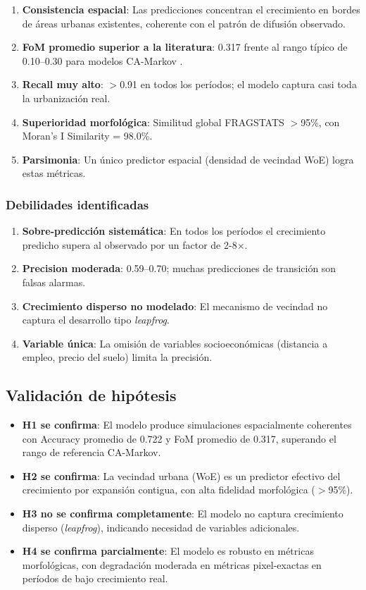 \begin{enumerate}
	\item \textbf{Consistencia espacial}: Las predicciones concentran el crecimiento en bordes de áreas urbanas existentes, coherente con el patrón de difusión observado.
	\item \textbf{FoM promedio superior a la literatura}: 0.317 frente al rango típico de 0.10--0.30 para modelos CA-Markov \parencite{pontius2008comparing}.
	\item \textbf{Recall muy alto}: $>$0.91 en todos los períodos; el modelo captura casi toda la urbanización real.
	\item \textbf{Superioridad morfológica}: Similitud global FRAGSTATS $>$95\%, con Moran's I Similarity = 98.0\%.
	\item \textbf{Parsimonia}: Un único predictor espacial (densidad de vecindad WoE) logra estas métricas.
\end{enumerate}

\subsubsection{Debilidades identificadas}

\begin{enumerate}
	\item \textbf{Sobre-predicción sistemática}: En todos los períodos el crecimiento predicho supera al observado por un factor de 2-8$\times$.
	\item \textbf{Precision moderada}: 0.59--0.70; muchas predicciones de transición son falsas alarmas.
	\item \textbf{Crecimiento disperso no modelado}: El mecanismo de vecindad no captura el desarrollo tipo \textit{leapfrog}.
	\item \textbf{Variable única}: La omisión de variables socioeconómicas (distancia a empleo, precio del suelo) limita la precisión.
\end{enumerate}

\subsection{Validación de hipótesis}

\begin{itemize}
	\item \textbf{H1 se confirma}: El modelo produce simulaciones espacialmente coherentes con Accuracy promedio de 0.722 y FoM promedio de 0.317, superando el rango de referencia CA-Markov.
	\item \textbf{H2 se confirma}: La vecindad urbana (WoE) es un predictor efectivo del crecimiento por expansión contigua, con alta fidelidad morfológica ($>$95\%).
	\item \textbf{H3 no se confirma completamente}: El modelo no captura crecimiento disperso (\textit{leapfrog}), indicando necesidad de variables adicionales.
	\item \textbf{H4 se confirma parcialmente}: El modelo es robusto en métricas morfológicas, con degradación moderada en métricas pixel-exactas en períodos de bajo crecimiento real.
\end{itemize}
